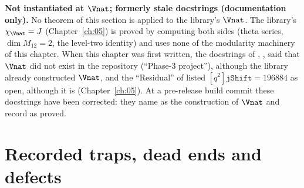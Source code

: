 \begin{warning}
\textbf{Not instantiated at $\Vnat$; formerly stale docstrings (documentation only).} No theorem of this section is applied to the library's $\Vnat$.
The library's $\chi_{\Vnat} = J$ (Chapter~\ref{ch:05}) is proved by computing both sides (theta series, $\dim M_{12} = 2$, the
level-two identity) and uses none of the modularity machinery of this chapter. When this chapter was first written, the docstrings of
, ,  said that $\Vnat$ did
not exist in the repository (``Phase-3 project''), although the library already constructed $\Vnat$, and the
``Residual'' of  listed $[q^2]\mathtt{jShift} = 196884$ as open, although it is 
(Chapter~\ref{ch:05}). At a pre-release build commit these docstrings have been corrected: they name  as the
construction of $\Vnat$ and record  as proved.
\end{warning}

\section{Recorded traps, dead ends and defects}\label{l14:sec:traps}


